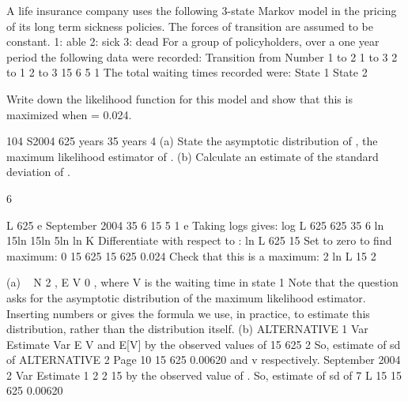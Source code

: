 \documentclass[a4paper,12pt]{article}
\begin{document}
A life insurance company uses the following 3-state Markov model in the pricing of
its long term sickness policies. The forces of transition are assumed to be constant.
1: able
2: sick
3: dead
For a group of policyholders, over a one year period the following data were
recorded:
Transition from Number
1 to 2
1 to 3
2 to 1
2 to 3 15
6
5
1
The total waiting times recorded were:
State 1
State 2
\item 
Write down the likelihood function for this model and show that this is
maximized when = 0.024.
\item 
104 S2004
625 years
35 years
4
(a) State the asymptotic distribution of , the maximum likelihood
estimator of .
(b) Calculate an estimate of the standard deviation of .




6
\item 
L
625
e
September 2004
35 6 15 5 1
e
Taking logs gives:
log L
625
625
35 6 ln
15ln
15ln
5ln
ln
K
Differentiate with respect to :
ln L
625
15
Set to zero to find maximum:
0
15
625
15
625
0.024
Check that this is a maximum:
2
ln L
15
2
\item 
(a)
~ N
2
,
E V
0
, where V is the waiting time in state 1
Note that the question asks for the asymptotic distribution of the maximum
likelihood estimator. Inserting numbers or gives the formula we use, in
practice, to estimate this distribution, rather than the distribution itself.
(b)
ALTERNATIVE 1
Var
Estimate
Var
E V
and E[V] by the observed values of
15
625 2
So, estimate of sd of
ALTERNATIVE 2
Page 10
15
625
0.00620
and v respectively. %
September 2004
2
Var
Estimate
1
2
2
15
by the observed value of .
So, estimate of sd of
7
L
15
15
625
0.00620
\end{document}
